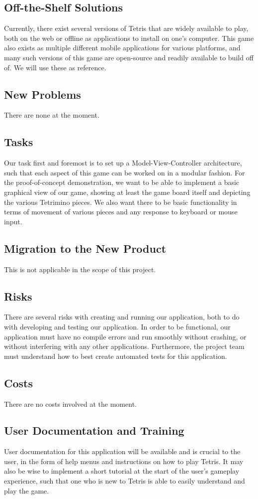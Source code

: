 \documentclass[12pt, titlepage]{article}
\begin{document}
\subsection{Off-the-Shelf Solutions}
Currently, there exist several versions of Tetris that are widely available to play, both on the web or offline as applications to install on one's computer. This game also exists as multiple different mobile applications for various platforms, and many such versions of this game are open-source and readily available to build off of. We will use these as reference.
\subsection{New Problems}
There are none at the moment.
\subsection{Tasks}
Our task first and foremost is to set up a Model-View-Controller architecture, such that each aspect of this game can be worked on in a modular fashion. For the proof-of-concept demonstration, we want to be able to implement a basic graphical view of our game, showing at least the game board itself and depicting the various Tetrimino pieces. We also want there to be basic functionality in terms of movement of various pieces and any response to keyboard or mouse input.
\subsection{Migration to the New Product}
This is not applicable in the scope of this project.
\subsection{Risks}
There are several risks with creating and running our application, both to do with developing and testing our application. In order to be functional, our application must have no compile errors and run smoothly without crashing, or without interfering with any other applications. Furthermore, the project team must understand how to best create automated tests for this application. 
\subsection{Costs}
There are no costs involved at the moment.
\subsection{User Documentation and Training}
User documentation for this application will be available and is crucial to the user, in the form of help menus and instructions on how to play Tetris. It may also be wise to implement a short tutorial at the start of the user's gameplay experience, such that one who is new to Tetris is able to easily understand and play the game. 
\end{document}
